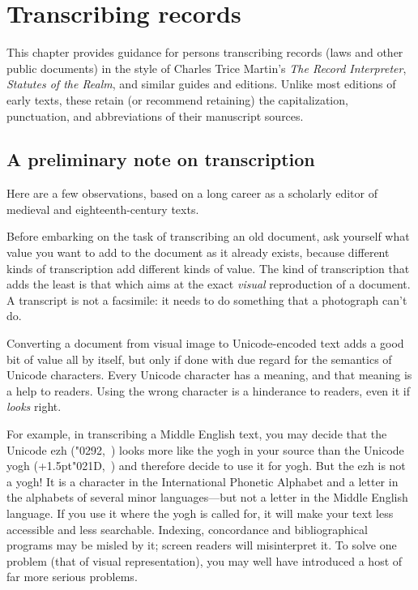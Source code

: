\chapter{Transcribing records}

This chapter provides guidance for persons transcribing records (laws and other
public documents) in the style of Charles Trice Martin’s
\textit{The Record Interpreter}, \textit{Statutes of the Realm}, and similar guides
and editions.
Unlike most editions of early texts, these retain (or recommend retaining) the capitalization,
punctuation, and abbreviations of their manuscript sources.

\section{A preliminary note on transcription}
Here are a few observations, based on a long career as a scholarly editor of medieval and eighteenth-century texts.

Before embarking on the task of transcribing an old document, ask yourself what value you want to add to the document as
it already exists, because different kinds of transcription add different kinds of value. The kind of transcription
that adds the least is that which aims at the exact \textit{visual} reproduction of a document. A transcript is not a
facsimile: it needs to do something that a photograph can't do.

Converting a document from visual image to Unicode-encoded text adds a good bit of value all by itself, but only if done
with due regard for the semantics of Unicode characters. Every Unicode character has a meaning, and that meaning is a
help to readers. Using the wrong character is a hinderance to readers, even it if \textit{looks} right.

For example, in transcribing a Middle English text, you may decide that the Unicode ezh (\char"0292,~) looks more like
the yogh in your source than the Unicode yogh (\kern+1.5pt\char"021D,~) and therefore decide to use it for yogh. But the ezh is
not a yogh! It is a character in the International Phonetic Alphabet and a letter in the alphabets of several minor
languages---but not a letter in the Middle English language. If you use it where the yogh is called for, it will make
your text less accessible and less searchable. Indexing, concordance and bibliographical programs may be misled by it;
screen readers will misinterpret it. To solve one problem (that of visual representation), you may well have introduced
a host of far more serious problems.

